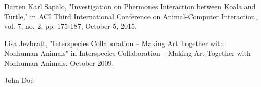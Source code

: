 \documentclass[conference]{IEEEtran}
\begin{document}

%
%
%
\begin{thebibliography}{1}

Darren Karl Sapalo, "Investigation on Phermones Interaction between Koala and Turtle," in ACI Third International Conference on Animal-Computer Interaction, vol. 7, no. 2, pp. 175-187, October 5, 2015.

Lisa Jevbratt, "Interspecies Collaboration – Making Art Together with Nonhuman Animals" in Interspecies Collaboration – Making Art Together with Nonhuman Animals, October 2009.
\end{thebibliography}

% 

\begin{IEEEbiography}{John Doe}
\blindtext
\end{IEEEbiography}


\vfill

\enlargethispage{-5in}
\end{document}
